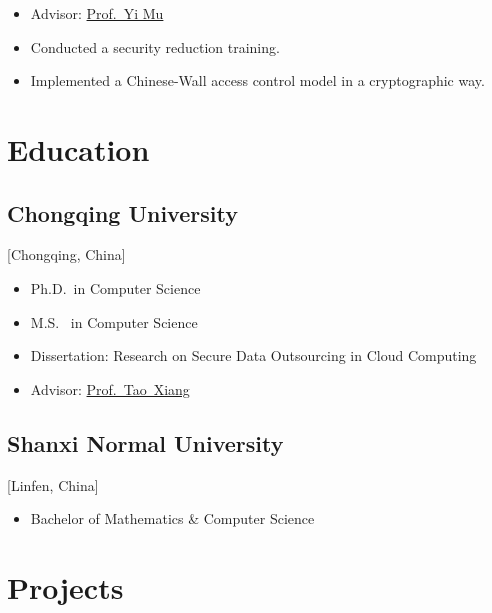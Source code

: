 \documentclass{mycv}
\begin{document}
\begin{itemize}
  \item Advisor: \href{https://sites.google.com/view/yi-mu-home-page/home}{Prof.~Yi Mu}
  \item Conducted a security reduction training.
  \item Implemented a Chinese-Wall access control model in a cryptographic way.
\end{itemize}

\section{Education}

\subsection{Chongqing University}[Chongqing, China]
\vspace{-\parskip}%
\begin{itemize}[label={}]
  \item Ph.D.\ in Computer Science 
  \item M.S. \ in Computer Science  
  \item Dissertation: Research on Secure Data Outsourcing in Cloud Computing
  \item Advisor: \href{http://www.cs.cqu.edu.cn/info/1331/4246.htm}{Prof.~Tao~Xiang}
\end{itemize}

\subsection{Shanxi Normal University}[Linfen, China]
\vspace{-\parskip}%
\begin{itemize}[label={}]
  \item Bachelor of Mathematics \& Computer Science 
\end{itemize}

\section{Projects}
\end{document}
